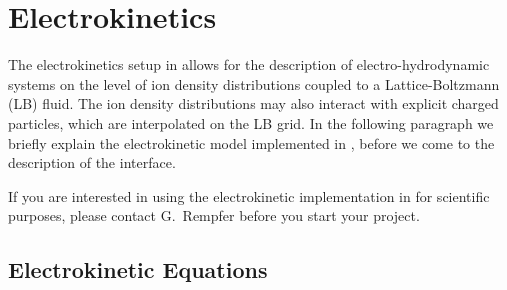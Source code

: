 %  
%   
%  
%  
%
\newcommand{\lb}{l_\mathrm{B}}
\newcommand{\kT}{k_\mathrm{B}T}

\chapter{\label{sec:electrokinetics}Electrokinetics}

The electrokinetics setup in \es{} allows for the description of
electro-hydrodynamic systems on the level of ion density distributions
coupled to a Lattice-Boltzmann (LB) fluid. The ion density
distributions may also interact with explicit charged particles, which
are interpolated on the LB grid.  In the following paragraph we
briefly explain the electrokinetic model implemented in \es, before
we come to the description of the interface.

If you are interested in using the electrokinetic implementation in
\es for scientific purposes, please contact G.~Rempfer before you
start your project.

\section{Electrokinetic Equations}


